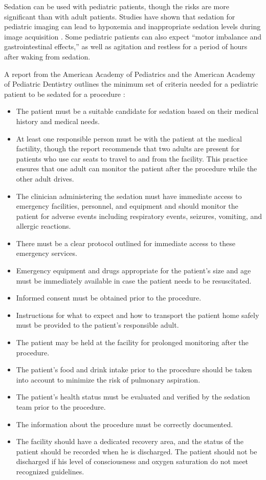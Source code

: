Sedation can be used with pediatric patients, though the risks are more significant than with adult patients. Studies have shown that sedation for pediatric imaging can lead to hypoxemia and inappropriate sedation levels during image acquisition \cite{Malviya2000}. Some pediatric patients can also expect ``motor imbalance and gastrointestinal effects,'' as well as agitation and restless for a period of hours after waking from sedation.

A report from the American Academy of Pediatrics and the American Academy of Pediatric Dentistry outlines the minimum set of criteria needed for a pediatric patient to be sedated for a procedure \cite{Cote2016}:
\begin{itemize}
\item The patient must be a suitable candidate for sedation based on their medical history and medical needs.
\item At least one responsible person must be with the patient at the medical factility, though the report recommends that two adults are present for patients who use car seats to travel to and from the facility. This practice ensures that one adult can monitor the patient after the procedure while the other adult drives.
\item The clinician administering the sedation must have immediate access to emergency facilities, personnel, and equipment and should monitor the patient for adverse events including respiratory events, seizures, vomiting, and allergic reactions.
\item There must be a clear protocol outlined for immediate access to these emergency services.
\item Emergency equipment and drugs appropriate for the patient's size and age must be immediately available in case the patient needs to be resuscitated.
\item Informed consent must be obtained prior to the procedure.
\item Instructions for what to expect and how to transport the patient home safely must be provided to the patient's responsible adult.
\item The patient may be held at the facility for prolonged monitoring after the procedure.
\item The patient's food and drink intake prior to the procedure should be taken into account to minimize the risk of pulmonary aspiration.
\item The patient's health status must be evaluated and verified by the sedation team prior to the procedure.
\item The information about the procedure must be correctly documented.
\item The facility should have a dedicated recovery area, and the status of the patient should be recorded when he is discharged. The patient should not be discharged if his level of consciousness and oxygen saturation do not meet recognized guidelines.
\end{itemize}
